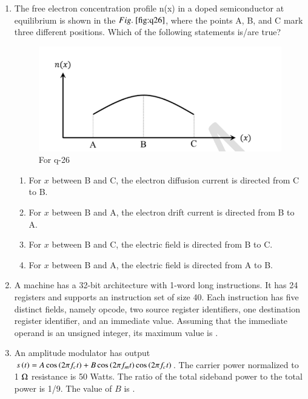\documentclass[journal,12pt,onecolumn]{IEEEtran}
\theoremstyle{remark}
\begin{document}
\begin{enumerate}
\item The free electron concentration profile n(x) in a doped semiconductor at equilibrium is shown in the $\figref{fig:q26}$, where the points A, B, and C mark three different positions. Which of the following statements is/are true?
\begin{figure}[H]
    \centering
    \includegraphics[width=0.5\columnwidth]{q26.png}
    \caption{For q-26}
    \label{fig:q26}
\end{figure}
\hfill{}
\begin{enumerate}
    \item For $x$ between B and C, the electron diffusion current is directed from C to B.
    \item For $x$ between B and A, the electron drift current is directed from B to A.
    \item For $x$ between B and C, the electric field is directed from B to C.
    \item For $x$ between B and A, the electric field is directed from A to B.
\end{enumerate}

\item A machine has a 32-bit architecture with 1-word long instructions. It has 24 registers and supports an instruction set of size 40. Each instruction has five distinct fields, namely opcode, two source register identifiers, one destination register identifier, and an immediate value. Assuming that the immediate operand is an unsigned integer, its maximum value is \underline{\hspace{2cm}}.

\hfill{}

\item An amplitude modulator has output  $s\left(t\right) = A\cos\left(2\pi f_c t\right) + B \cos\left(2\pi f_m t\right)\cos\left(2\pi f_c t\right)$. The carrier power normalized to 1 $\ohm$ resistance is 50 Watts. The ratio of the total sideband power to the total power is 1/9. The value of $B$  is \underline{\hspace{2cm}}.

\hfill{}


\end{enumerate}
\end{document}

